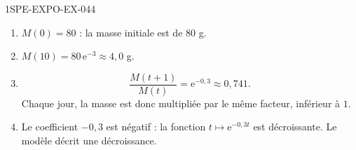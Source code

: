 \begin{corrige}{1SPE-EXPO-EX-044}
\begin{enumerate}
\item $M(0)=80$ : la masse initiale est de $80$ g.
\item $M(10)=80\,\mathrm{e}^{-3}\approx 4{,}0$ g.
\item
\[\frac{M(t+1)}{M(t)}=\mathrm{e}^{-0{,}3}\approx 0{,}741.\]
Chaque jour, la masse est donc multipliée par le même facteur, inférieur à $1$.
\item Le coefficient $-0{,}3$ est négatif : la fonction $t\mapsto \mathrm{e}^{-0{,}3t}$ est décroissante. Le modèle décrit une décroissance.
\end{enumerate}
\end{corrige}
